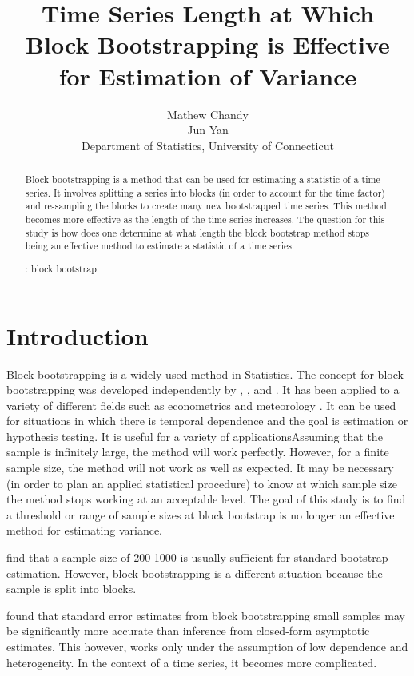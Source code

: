 \documentclass[12pt, letterpaper, titlepage]{article}
\title{Time Series Length at Which Block Bootstrapping is Effective for Estimation of Variance}
\author{Mathew Chandy\\
  Jun Yan\\[1ex]
  Department of Statistics, University of Connecticut\\
}
\date{}
\begin{document}
 
\maketitle

\doublespace

\begin{abstract}
Block bootstrapping is a method that can be used for estimating a statistic of a time
series. It involves splitting a series into blocks (in order to account for the time
factor) and re-sampling the blocks to create many new bootstrapped time series.
This method becomes more effective as the length of the time series increases. 
The question for this study is how does one determine at what length the block
bootstrap method stops being an effective method to estimate a statistic of a time
series.

\bigskip
\noindent{}:
block bootstrap;
\end{abstract}

\section{Introduction}
\label{sec:intro}

Block bootstrapping is a widely used method in Statistics. The concept for block 
bootstrapping was developed independently by \citet{Hall}, \citet{Carlstein}, and 
\citet{Kunsch}. \citet{Radovanov} It has been applied to a variety of 
different fields such 
as econometrics \citep{MacKinnon} and meteorology \citep{Varga}. It can be used for 
situations in which there is temporal dependence and the goal is estimation or hypothesis 
testing. It is useful for a variety of applicationsAssuming that the sample is infinitely 
large, the method will work perfectly. However, for a finite sample size, the method will 
not work as well as expected. It may be necessary (in order to plan an applied 
statistical 
procedure) to know at which sample size the method stops working at an acceptable level. 
The goal of this study is to find a threshold or range of sample sizes at block bootstrap 
is no longer an effective method for estimating variance.


\citet{Nevitt} find that a sample size of 200-1000 is usually sufficient for standard 
bootstrap estimation. However, block bootstrapping is a different situation because the 
sample is split into blocks.

\citet{Goncalves} found that standard error estimates from block bootstrapping small 
samples 
may be significantly more accurate than inference from closed-form asymptotic estimates. 
This however, works only under the assumption of low dependence and heterogeneity. In the
context of a time series, it becomes more complicated.
\end{document}
